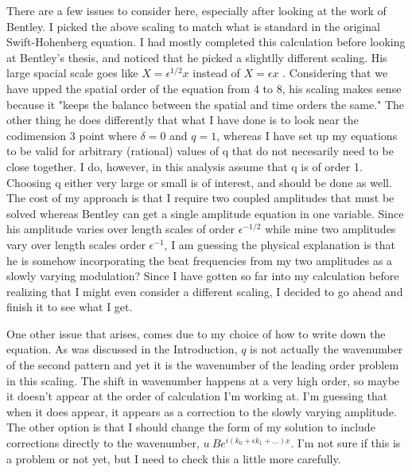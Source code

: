 \documentclass[api,pof,pre,12pt,a4paper]{revtex4-1}
\begin{document}
There are a few issues to consider here, especially after looking at the work of Bentley.  I picked the above scaling to match what is standard in the original Swift-Hohenberg equation.  I had mostly completed this calculation before looking at Bentley's thesis, and noticed that he picked a slightlly different scaling.    His large spacial scale goes like  $X=\epsilon^{1/2} x$ instead of  $X=\epsilon x$ .   Considering that we have upped the spatial order of the equation from 4 to 8,  his scaling makes sense because it "keeps the balance between the spatial and time orders the same."   The other thing he does differently that what I have done is to look near the codimension 3 point where $\delta=0$ and $q=1$, whereas I have set up my equations  to be valid for arbitrary (rational) values of q that do not necesarily need to be close together.  I do, however, in this analysis assume that q is of order 1.  Choosing q either very large or small is of interest, and should be done as well.  The cost of my approach is that I require two coupled amplitudes that must be solved whereas Bentley can get a single amplitude equation in one variable.  Since his amplitude varies over length scales of order $\epsilon^{-1/2}$ while mine two amplitudes vary over length scales order $\epsilon^{-1}$, I am guessing the physical explanation is that he is somehow incorporating the beat frequencies from my two amplitudes as a slowly varying modulation?  Since I have gotten so far into my calculation before realizing that I might even consider a different scaling, I decided to go ahead and finish it to see what I get.

One other issue that arises, comes due to my choice of how to write down the equation. As was discussed in the Introduction, $q$ is not actually the wavenumber of the second pattern and yet it is the wavenumber of the leading order problem in this scaling.  The shift in wavenumber happens at a very high order, so maybe it doesn't appear at the order of calculation I'm working at.  I'm guessing that when it does appear, it appears as a correction to the slowly varying amplitude.  The other option is that I should change the form of my solution to include corrections directly to the wavenumber, $u~B e^{i(k_0+\epsilon k_1+...)x}$.  I'm not sure if this is a problem or not yet, but I need to check this a little more carefully.
\end{document}
